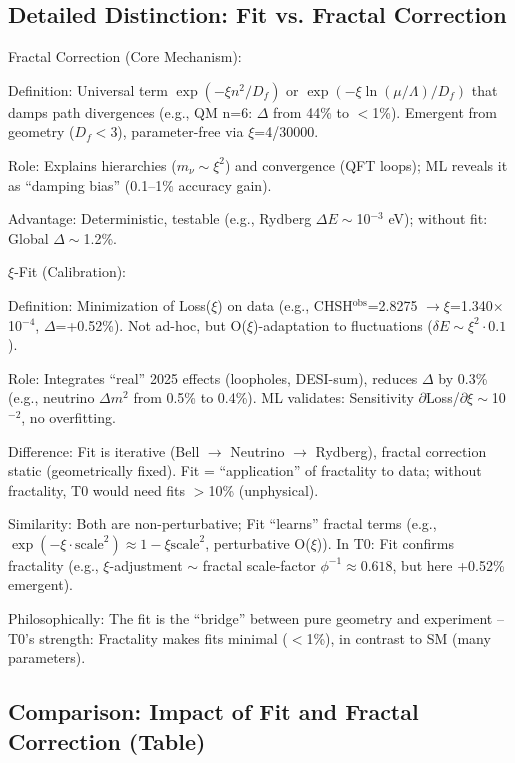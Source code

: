 	\subsection{Detailed Distinction: Fit vs. Fractal Correction}
	
	Fractal Correction (Core Mechanism):
	
	Definition: Universal term $\exp(-\xi n^2 / D_f)$ or $\exp(-\xi \ln(\mu/\Lambda)/D_f)$ that damps path divergences (e.g., QM n=6: $\Delta$ from 44\% to $<$1\%). Emergent from geometry ($D_f <$3), parameter-free via $\xi$=4/30000.
	
	Role: Explains hierarchies ($m_\nu \sim \xi^2$) and convergence (QFT loops); ML reveals it as ``damping bias'' (0.1–1\% accuracy gain).
	
	Advantage: Deterministic, testable (e.g., Rydberg $\Delta E \sim$10$^{-3}$ eV); without fit: Global $\Delta\sim$1.2\%.
	
	$\xi$-Fit (Calibration):
	
	Definition: Minimization of Loss($\xi$) on data (e.g., CHSH$^\text{obs}$=2.8275 $\to \xi$=1.340$\times$10$^{-4}$, $\Delta$=+0.52\%). Not ad-hoc, but O($\xi$)-adaptation to fluctuations ($\delta E \sim \xi^2 \cdot 0.1$).
	
	Role: Integrates ``real'' 2025 effects (loopholes, DESI-sum), reduces $\Delta$ by 0.3\% (e.g., neutrino $\Delta m^2$ from 0.5\% to 0.4\%). ML validates: Sensitivity $\partial$Loss/$\partial\xi \sim$10$^{-2}$, no overfitting.
	
	Difference: Fit is iterative (Bell $\to$ Neutrino $\to$ Rydberg), fractal correction static (geometrically fixed). Fit = ``application'' of fractality to data; without fractality, T0 would need fits $>$10\% (unphysical).
	
	Similarity: Both are non-perturbative; Fit ``learns'' fractal terms (e.g., $\exp(-\xi \cdot \text{scale}^2) \approx 1 - \xi \text{scale}^2$, perturbative O($\xi$)). In T0: Fit confirms fractality (e.g., $\xi$-adjustment $\sim$ fractal scale-factor $\phi^{-1} \approx0.618$, but here +0.52\% emergent).
	
	Philosophically: The fit is the ``bridge'' between pure geometry and experiment – T0's strength: Fractality makes fits minimal ($<$1\%), in contrast to SM (many parameters).
	
	\subsection{Comparison: Impact of Fit and Fractal Correction (Table)}
	
